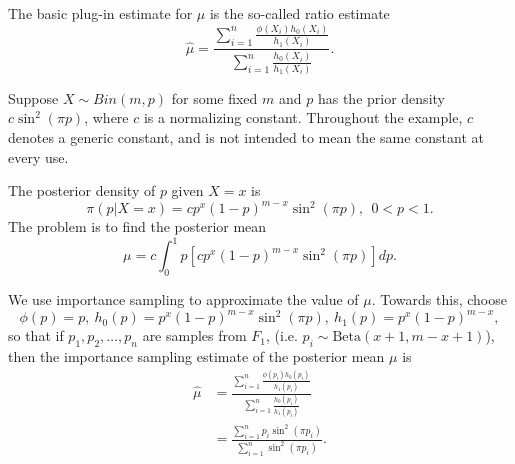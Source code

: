 The basic plug-in estimate for $\mu$ is the so-called ratio estimate
\[
	\hat{\mu} = \frac{\sum_{i = 1}^{n}\frac{\phi(X_i)h_0(X_i)}{h_1(X_i)} }{\sum_{i = 1}^{n} \frac{h_0(X_i)}{h_1(X_i)}}.
\]

\begin{example}
	\label{Binomial Bayes problem with an Atypical Prior}
	Suppose $X\sim Bin(m,p)$ for some fixed $m$ and $p$ has the prior density $c\sin^{2}(\pi p)$,
	where $c$ is a normalizing constant.
	Throughout the example, $c$ denotes a generic constant,
	and is not intended to mean the same constant at every use.

	The posterior density of $p$ given $X = x$ is
	\[
		\pi(p|X=x) = cp^{x}(1-p)^{m-x}\sin ^{2}(\pi p), \ \ 0<p<1.
	\]
	The problem is to find the posterior mean
	\[
		\mu = c \int_{0}^{1} p[cp^{x}(1-p)^{m-x}\sin ^{2}(\pi p)]dp.
	\]

	We use importance sampling to approximate the value of $\mu$. Towards this, choose
	\[
		\phi(p)=p, \ h_0(p) = p^{x} (1-p)^{m-x} \sin ^{2}(\pi p),\ h_1(p) = p^{x}(1-p)^{m-x},
	\]
    so that if $p_1,p_2,\ldots,p_n$ are samples from $F_1$, (i.e. $p_i\sim \text{Beta}(x+1, m-x+1)$),
	then the importance sampling estimate of the posterior mean $\mu$ is
	\begin{align*}
		\hat{\mu} & = \frac{\sum_{i=1}^{n}\frac{\phi(p_i)h_0(p_i)}{h_1(p_i)} }{\sum_{i=1}^{n}\frac{h_0(p_i)}{h_1(p_i)} } \\
		          & = \frac{\sum_{i=1}^{n}p_i\sin ^{2}(\pi p_i) }{\sum_{i=1}^{n} \sin ^{2}(\pi p_i) }.
	\end{align*}


\end{example}

